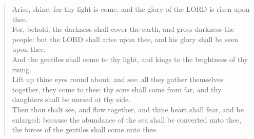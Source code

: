 \documentclass[MAIN]{subfiles}
\begin{document}
\begin{verse}
Arise, shine; for thy light is come, and the glory of the {\hge LORD} is risen upon thee.\\
For, behold, the darkness shall cover the earth, and gross darkness the people: but the {\hge LORD} shall arise upon thee, and his
glory shall be seen upon thee.\\
And the gentiles shall come to thy light, and kings to the brightness of thy rising.\\
Lift up thine eyes round about, and see: all they gather themselves together, they come to thee: thy sons shall come from
far, and thy daughters shall be nursed at thy side.\\
Then thou shalt see, and flow together, and thine heart shall fear, and be enlarged; because the abundance of the sea shall be converted unto thee, the forces of the gentiles shall come unto thee.
\end{verse}
\end{document}
